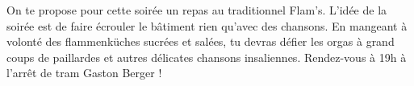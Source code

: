 On te propose pour cette soirée un repas au traditionnel Flam's. L'idée de la
soirée est de faire écrouler le bâtiment rien qu'avec des chansons. En mangeant
à volonté des flammenküches sucrées et salées, tu devras défier les orgas à
grand coups de paillardes et autres délicates chansons insaliennes. Rendez-vous
à 19h à l'arrêt de tram Gaston Berger !
